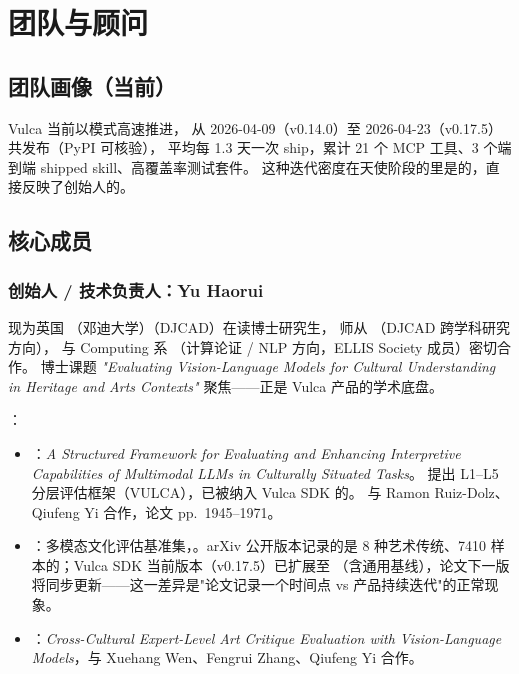 \section{团队与顾问}
\label{sec:team}

\subsection{团队画像（当前）}

Vulca 当前以模式高速推进，
从 2026-04-09（v0.14.0）至 2026-04-23（v0.17.5）共发布（PyPI 可核验），
平均每 1.3 天一次 ship，累计 21 个 MCP 工具、3 个端到端 shipped skill、高覆盖率测试套件。
这种迭代密度在天使阶段的里是的，直接反映了创始人的。

\subsection{核心成员}

\subsubsection*{创始人 / 技术负责人：Yu Haorui}

\quad
现为英国 （邓迪大学）（DJCAD）在读博士研究生，
师从 （DJCAD 跨学科研究方向），
与 Computing 系 （计算论证 / NLP 方向，ELLIS Society 成员）密切合作。
博士课题 \textit{"Evaluating Vision-Language Models for Cultural Understanding in Heritage and Arts Contexts"}
聚焦——正是 Vulca 产品的学术底盘。

：
\begin{itemize}
  \item {}：\textit{A Structured Framework for Evaluating and Enhancing Interpretive Capabilities of Multimodal LLMs in Culturally Situated Tasks}。
  提出 L1–L5 分层评估框架（VULCA），已被纳入 Vulca SDK 的。
  与 Ramon Ruiz-Dolz、Qiufeng Yi 合作，论文 pp.~1945–1971。
  \item {}：多模态文化评估基准集，。arXiv 公开版本记录的是 8 种艺术传统、7410 样本的；Vulca SDK 当前版本（v0.17.5）已扩展至 （含通用基线），论文下一版将同步更新——这一差异是"论文记录一个时间点 vs 产品持续迭代"的正常现象。
  \item {}：\textit{Cross-Cultural Expert-Level Art Critique Evaluation with Vision-Language Models}，与 Xuehang Wen、Fengrui Zhang、Qiufeng Yi 合作。
\end{itemize}


